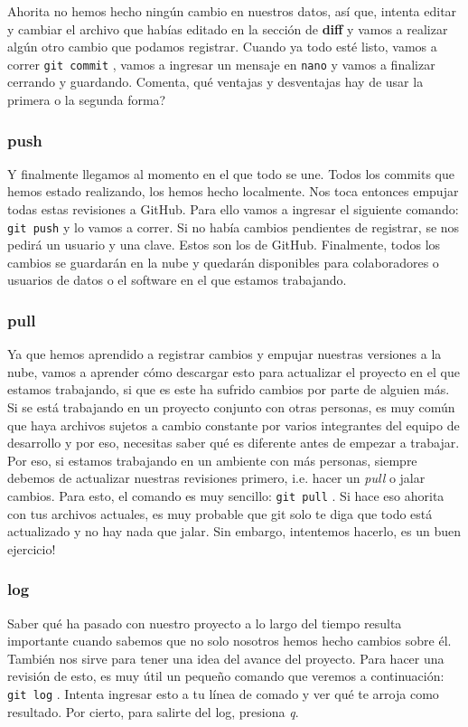 \documentclass[10pt,letterpaper]{article}
\newcommand{\inlinecode}[1]{
\colorbox{light-gray}{\texttt{#1}}
}
\begin{document}
Ahorita no hemos hecho ning\'un cambio en nuestros datos, as\'i que, intenta editar y cambiar el archivo que hab\'ias editado en la secci\'on de \textbf{diff} y vamos a realizar alg\'un otro cambio que podamos registrar. Cuando ya todo est\'e listo, vamos a correr \inlinecode{git commit}, vamos a ingresar un mensaje en \inlinecode{nano} y vamos a finalizar cerrando y guardando. Comenta, qu\'e ventajas y desventajas hay de usar la primera o la segunda forma?

\subsubsection{push}
Y finalmente llegamos al momento en el que todo se une. Todos los commits que hemos estado realizando, los hemos hecho localmente. Nos toca entonces empujar todas estas revisiones a GitHub. Para ello vamos a ingresar el siguiente comando: \inlinecode{git push} y lo vamos a correr. Si no hab\'ia cambios pendientes de registrar, se nos pedir\'a un usuario y una clave. Estos son los de GitHub. Finalmente, todos los cambios se guardar\'an en la nube y quedar\'an disponibles para colaboradores o usuarios de datos o el software en el que estamos trabajando.

\subsubsection{pull}
Ya que hemos aprendido a registrar cambios y empujar nuestras versiones a la nube, vamos a aprender c\'omo descargar esto para actualizar el proyecto en el que estamos trabajando, si que es este ha sufrido cambios por parte de alguien m\'as. Si se est\'a trabajando en un proyecto conjunto con otras personas, es muy com\'un que haya archivos sujetos a cambio constante por varios integrantes del equipo de desarrollo y por eso, necesitas saber qu\'e es diferente antes de empezar a trabajar.\\

Por eso, si estamos trabajando en un ambiente con m\'as personas, siempre debemos de actualizar nuestras revisiones primero, i.e. hacer un \emph{pull} o jalar cambios. Para esto, el comando es muy sencillo: \inlinecode{git pull}. Si hace eso ahorita con tus archivos actuales, es muy probable que git solo te diga que todo est\'a actualizado y no hay nada que jalar. Sin embargo, intentemos hacerlo, es un buen ejercicio!

\subsubsection{log}
Saber qu\'e ha pasado con nuestro proyecto a lo largo del tiempo resulta importante cuando sabemos que no solo nosotros hemos hecho cambios sobre \'el. Tambi\'en nos sirve para tener una idea del avance del proyecto. Para hacer una revisi\'on de esto, es muy \'util un peque\~no comando que veremos a continuaci\'on: \inlinecode{git log}. Intenta ingresar esto a tu l\'inea de comado y ver qu\'e te arroja como resultado. Por cierto, para salirte del log, presiona \emph{q}.\\
\end{document}
